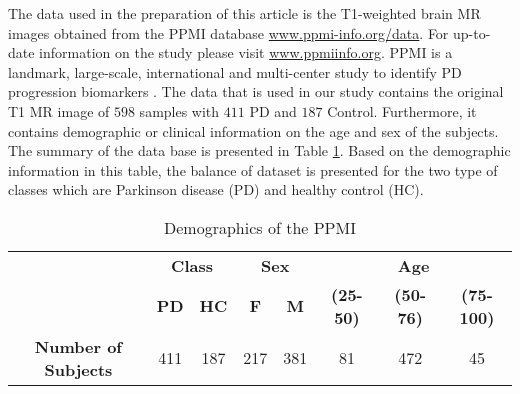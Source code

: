 \documentclass[runningheads,a4paper]{llncs}
\begin{document}
The data used in the preparation of this article is the T1-weighted brain MR images obtained from the PPMI database \url{www.ppmi-info.org/data}. For up-to-date information on the study please visit \url{www.ppmiinfo.org}. PPMI is a landmark, large-scale, international and multi-center study to identify PD progression biomarkers \cite{15}. The data that is used in our study contains the original T1 MR image of $598$ samples with $411$ PD and $187$ Control. Furthermore, it contains demographic or clinical information on the age and sex of the subjects. The summary of the data base is presented in Table \ref{tab:ppmi}. Based on the demographic information in this table, the balance of dataset is presented for the two type of classes which are Parkinson disease (PD) and healthy control (HC).
\begin{table}[h]\small
  \centering
  \caption{Demographics of the PPMI}
  \begin{tabular}{|>{\bfseries}c|*{7}{c|}}\hline
    \multirow{2}{*}{\bfseries Data Type}
    & \multicolumn{2}{c|}{\bfseries Class}
    &\multicolumn{2}{c|}{\bfseries Sex}
    & \multicolumn{3}{c|}{\bfseries Age} \\\cline{2-8}
    & \textbf{PD} & \textbf{HC} & \textbf{F}&\textbf{M} & \textbf{(25-50)}&\textbf{(50-76)} &\textbf{(75-100)}\\ \hline
           Number of Subjects   &411 & 187 & 217 & 381 & 81&472&45      \\ \hline
  \end{tabular}
  \label{tab:ppmi}
\end{table}



\end{document}
